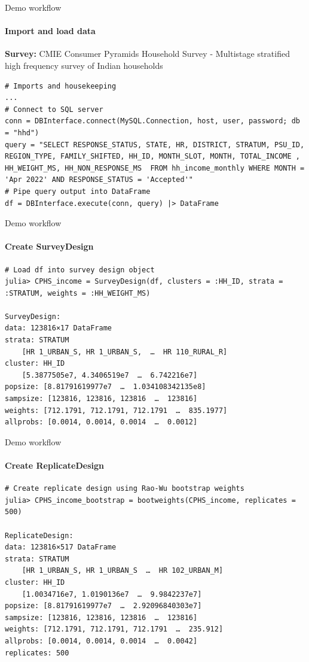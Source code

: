 \documentclass{beamer}          %
\begin{document}
\begin{frame}[fragile]{Demo workflow}
\framesubtitle{Import and load data}
\textbf{Survey:} CMIE Consumer Pyramids Household Survey - Multistage stratified high frequency survey of Indian households
\scriptsize
\begin{verbatim}
# Imports and housekeeping
...
# Connect to SQL server
conn = DBInterface.connect(MySQL.Connection, host, user, password; db = "hhd")
query = "SELECT RESPONSE_STATUS, STATE, HR, DISTRICT, STRATUM, PSU_ID, REGION_TYPE, FAMILY_SHIFTED, HH_ID, MONTH_SLOT, MONTH, TOTAL_INCOME , HH_WEIGHT_MS, HH_NON_RESPONSE_MS  FROM hh_income_monthly WHERE MONTH = 'Apr 2022' AND RESPONSE_STATUS = 'Accepted'"
# Pipe query output into DataFrame
df = DBInterface.execute(conn, query) |> DataFrame
\end{verbatim}
\end{frame}

\begin{frame}[fragile]{Demo workflow}
\framesubtitle{Create SurveyDesign}
\begin{verbatim}
# Load df into survey design object
julia> CPHS_income = SurveyDesign(df, clusters = :HH_ID, strata = :STRATUM, weights = :HH_WEIGHT_MS)

SurveyDesign:
data: 123816×17 DataFrame
strata: STRATUM
    [HR 1_URBAN_S, HR 1_URBAN_S,  …  HR 110_RURAL_R]
cluster: HH_ID
    [5.3877505e7, 4.3406519e7  …  6.742216e7]
popsize: [8.81791619977e7  …  1.034108342135e8]
sampsize: [123816, 123816, 123816  …  123816]
weights: [712.1791, 712.1791, 712.1791  …  835.1977]
allprobs: [0.0014, 0.0014, 0.0014  …  0.0012]
\end{verbatim}
\end{frame}

\begin{frame}[fragile]{Demo workflow}
\framesubtitle{Create ReplicateDesign}
\begin{verbatim}
# Create replicate design using Rao-Wu bootstrap weights
julia> CPHS_income_bootstrap = bootweights(CPHS_income, replicates = 500)

ReplicateDesign:
data: 123816×517 DataFrame
strata: STRATUM
    [HR 1_URBAN_S, HR 1_URBAN_S  …  HR 102_URBAN_M]
cluster: HH_ID
    [1.0034716e7, 1.0190136e7  …  9.9842237e7]
popsize: [8.81791619977e7  …  2.92096840303e7]
sampsize: [123816, 123816, 123816  …  123816]
weights: [712.1791, 712.1791, 712.1791  …  235.912]
allprobs: [0.0014, 0.0014, 0.0014  …  0.0042]
replicates: 500
\end{verbatim}
\end{frame}
\end{document}
